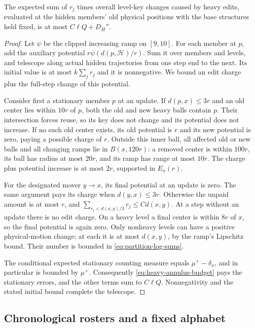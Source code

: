 \begin{lemma}\label{lem:heavy-edits}
The expected sum of \(r_j\) times overall level-key changes caused by
heavy edits, evaluated at the hidden members' old physical positions with
the base structures held fixed, is at most \(C\ell Q+D_H''\).
\end{lemma}
\begin{proof}
Let \(\psi\) be the clipped increasing ramp on \([9,10]\).  For each
member at \(p\), add the auxiliary potential
\(r\psi(d(p,\mathcal H)/r)\).  Sum it over members and levels, and
telescope along actual hidden trajectories from one step end to the next.
Its initial value is at most \(k\sum_jr_j\) and it is nonnegative.
We bound an edit charge plus the full-step change of this potential.

Consider first a stationary member \(p\) at an update.  If
\(d(p,x)\le3r\) and an old center lies within \(10r\) of \(p\), both
the old and new heavy balls contain \(p\).  Their intersection forces
reuse, so its key does not change and its potential does not increase.
If no such old center exists, its old potential is \(r\) and its new
potential is zero, paying a possible charge of \(r\).  Outside this
inner ball, all affected old or new balls and all changing ramps lie in
\(B(x,120r)\): a removed center is within \(100r\), its ball has radius
at most \(20r\), and its ramp has range at most \(10r\).  The charge
plus potential increase is at most \(2r\), supported in \(E_x(r)\).

For the designated mover \(y\to x\), its final potential at an update
is zero.  The same argument pays its charge when \(d(y,x)\le3r\).
Otherwise the unpaid amount is at most \(r\), and
\(\sum_{r_j<d(x,y)/3}r_j\le C d(x,y)\).  At a step without an update
there is no edit charge.  On a heavy level a final center is within
\(8r\) of \(x\), so the final potential is again zero.  Only nonheavy
levels can have a positive physical-motion change; at each it is at most
\(d(x,y)\), by the ramp's Lipschitz bound.  Their number is bounded in
\eqref{eq:partition-log-sums}.

The conditional expected stationary counting measure equals
\(\mu^+-\delta_x\), and in particular is bounded by \(\mu^+\).
Consequently \eqref{eq:heavy-annulus-budget} pays the stationary errors,
and the other terms sum to \(C\ell Q\).  Nonnegativity and the stated
initial bound complete the telescope.
\end{proof}

\subsection{Chronological rosters and a fixed alphabet}

